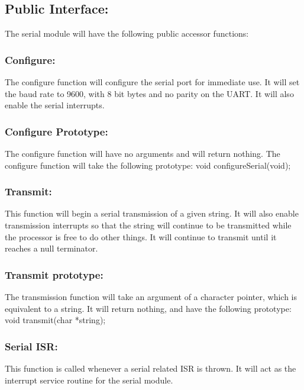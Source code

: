\documentclass[]{article}
\begin{document}
\subsection{Public Interface:}
The serial module will have the following public accessor functions:

\subsubsection{Configure:}
The configure function will configure the serial port for immediate use. It will set the baud rate to 9600, with 8 bit bytes and no parity on the UART. It will also enable the serial interrupts.

\subsubsection{Configure Prototype:}
The configure function will have no arguments and will return nothing. The configure function will take the following prototype: \newline \newline
void configureSerial(void);

\subsubsection{Transmit:}
This function will begin a serial transmission of a given string. It will also enable transmission interrupts so that the string will continue to be transmitted while the processor is free to do other things. It will continue to transmit until it reaches a null terminator.

\subsubsection{Transmit prototype:}
The transmission function will take an argument of a character pointer, which is equivalent to a string. It will return nothing, and have the following prototype: \newline \newline
void transmit(char *string);

\subsubsection{Serial ISR:}
This function is called whenever a serial related ISR is thrown. It will act as the interrupt service routine for the serial module.
\end{document}
